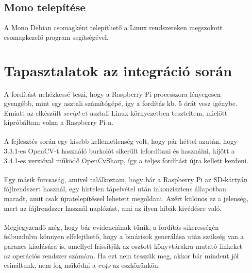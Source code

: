 \subsection{Mono telepítése}

A Mono Debian csomagként telepíthető a Linux rendszereken megszokott  csomagkezelő program segítségével.

\section{Tapasztalatok az integráció során}

A fordítást nehézkessé teszi, hogy a Raspberry Pi processzora lényegesen gyengébb, mint egy asztali számítógépé, így a fordítás kb. 5 órát vesz igénybe. Emiatt az elkészült \textit{script}-et asztali Linux környezetben teszteltem, mielőtt kipróbáltam volna a Raspberry Pi-n. \\
\\
A fejlesztés során egy kisebb kellemetlenség volt, hogy pár héttel azután, hogy 3.3.1-es OpenCV-t használó burkolót sikerült lefordítani és használni, kijött a 3.4.1-es verzióval működő OpenCvSharp, így a teljes fordítást újra kellett kezdeni. \\
\\
Egy másik furcsaság, amivel találkoztam, hogy bár a Raspberry Pi az SD-kártyán  fájlrendszert használ, egy hirtelen tápelvétel után inkonzisztens állapotban maradt, amit csak újratelepítéssel lehetett megoldani. Azért különös ez a jelenség, mert az  fájlrendszer használ naplózást, ami az ilyen hibák kivédésre való.\\
\\
Megjegyzendő még, hogy bár evidenciának tűnik, a fordítás sikerességén felbuzdulva könnyen elfelejthető, hogy a binárisok generálása után szükség van a  parancs kiadására is, amellyel frissítjük az osztott könyvtárakra mutató linkeket az operációs rendszer számára. Ha ezt nem tesszük meg, akkor bár mindent jól csináltunk, nem fog működni a \emph{cv4s} az eszközünkön.

